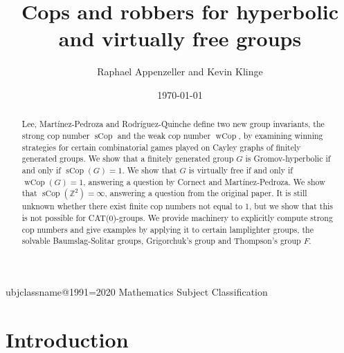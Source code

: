 \documentclass{amsart}
\theoremstyle{definition}
\theoremstyle{remark}
\theoremstyle{remark}
\theoremstyle{definition}
\newcommand{\sCop}{\operatorname{sCop}}
\newcommand{\wCop}{\operatorname{wCop}}
\begin{document}
\title[Cops and robbers for hyperbolic and virtually free groups]{Cops and robbers for hyperbolic\\ and virtually free groups}


\author{Raphael Appenzeller and Kevin Klinge}

\date{\today}      %
\address{Department of Mathematics, Universität Heidelberg, Germany}

\address{Department of Mathematics, Universität Heidelberg, Germany}


\def\subjclassname{\textup{2020} Mathematics Subject Classification}
\expandafter\let\csname subjclassname@1991\endcsname=\subjclassname
{}



\begin{abstract}
Lee, Martínez-Pedroza and Rodríguez-Quinche define two new group invariants, the strong cop number $\sCop$ and the weak cop number $\wCop$, by examining winning strategies for certain combinatorial games played on Cayley graphs of finitely generated groups. We show that a finitely generated group $G$ is Gromov-hyperbolic if and only if $\sCop(G) = 1$. We show that $G$ is virtually free if and only if $\wCop(G)=1$, answering a question by Cornect and Martínez-Pedroza. We show that $\sCop(\mathbb{Z}^2) = \infty$, answering a question from the original paper. It is still unknown whether there exist finite cop numbers not equal to 1, but we show that this is not possible for CAT(0)-groups. We provide machinery to explicitly compute strong cop numbers and give examples by applying it to certain lamplighter groups, the solvable Baumslag-Solitar groups, Grigorchuk's group and Thompson's group $F$.

\end{abstract}

\maketitle



\section{Introduction}
\end{document}
